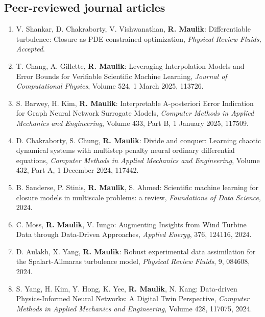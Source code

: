 \documentclass[letterpaper]{article}
\begin{document}
\subsection*{Peer-reviewed journal articles}

\begin{enumerate}

\item V. Shankar, D. Chakraborty, V. Vishwanathan, \textbf{R. Maulik}: Differentiable turbulence: Closure as PDE-constrained optimization, {\it Physical Review Fluids, Accepted}.

\item T. Chang, A. Gillette, \textbf{R. Maulik}: Leveraging Interpolation Models and Error Bounds for Verifiable Scientific Machine Learning, {\it Journal of Computational Physics}, Volume 524, 1 March 2025, 113726.

\item S. Barwey, H. Kim, \textbf{R. Maulik}: Interpretable A-posteriori Error Indication for Graph Neural Network Surrogate Models, {\it Computer Methods in Applied Mechanics and Engineering}, Volume 433, Part B, 1 January 2025, 117509.

\item D. Chakraborty, S. Chung, \textbf{R. Maulik}: Divide and conquer: Learning chaotic dynamical systems with multistep penalty neural ordinary differential equations, {\it Computer Methods in Applied Mechanics and Engineering}, Volume 432, Part A, 1 December 2024, 117442.

\item B. Sanderse, P. Stinis, \textbf{R. Maulik}, S. Ahmed: Scientific machine learning for closure models in multiscale problems: a review, {\it Foundations of Data Science}, 2024.

\item C. Moss, \textbf{R. Maulik}, V. Iungo: Augmenting Insights from Wind Turbine Data through Data-Driven Approaches, {\it Applied Energy}, 376, 124116, 2024.

\item D. Aulakh, X. Yang, \textbf{R. Maulik}: Robust experimental data assimilation for the Spalart-Allmaras turbulence model, {\it Physical Review Fluids}, 9, 084608, 2024.

\item S. Yang, H. Kim, Y. Hong, K. Yee, \textbf{R. Maulik}, N. Kang:  Data-driven Physics-Informed Neural Networks: A Digital Twin Perspective, {\it Computer Methods in Applied Mechanics and Engineering}, Volume 428, 117075, 2024.


\end{enumerate}
\end{document}

